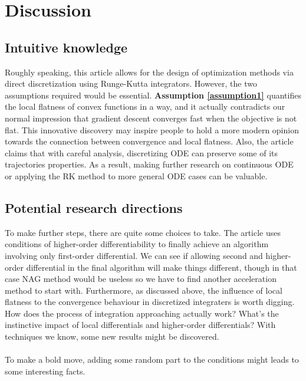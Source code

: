 \section{Discussion}

\subsection{Intuitive knowledge}

Roughly speaking, this article allows for the design of optimization
methods via direct discretization using Runge-Kutta integrators. However, the two
assumptions required would be essential. \textbf{Assumption \ref{assumption1}} quantifies the local flatness
of convex functions in a way, and it actually contradicts our normal impression that
gradient descent converges fast when the objective is not flat. This innovative discovery
may inspire people to hold a more modern opinion towards the connection between
convergence and local flatness. Also, the article claims that with careful
analysis, discretizing ODE can preserve some of its trajectories properties.
As a result, making further research on continuous ODE or applying the RK method to
more general ODE cases can be valuable.

\subsection{Potential research directions}

To make further steps, there are quite some choices to take. The article uses conditions
of higher-order differentiability to finally achieve an algorithm involving only
first-order differential. We can see if allowing second and higher-order differential in
the final algorithm will make things different, though in that case NAG method
would be useless so we have to find another acceleration method to start with. Furthermore,
as discussed above, the influence of local flatness to the convergence behaviour in
discretized integraters is worth digging. How does the process of integration approaching
actually work? What's the instinctive impact of local differentials and higher-order
differentials? With techniques we know, some new results might be discovered.\\\\
To make a bold move, adding some random part to the conditions might leads to some
interesting facts.\\\\